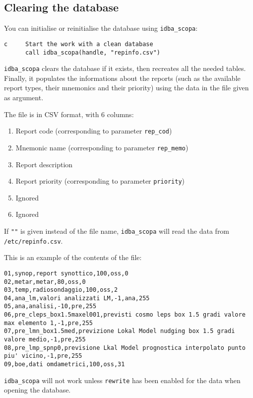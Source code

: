\documentclass[final,12pt,a4paper,twoside]{book}
\begin{document}
\subsection {Clearing the database}

You can initialise or reinitialise the database using {\tt idba\_scopa}:
\label{fun-idba_scopa}

\begin{verbatim}
c     Start the work with a clean database
      call idba_scopa(handle, "repinfo.csv")
\end{verbatim}

{\tt idba\_scopa} clears the database if it exists, then recreates all the
needed tables.  Finally, it populates the informations about the reports (such
as the available report types, their mnemonics and their priority) using the
data in the file given as argument.

The file is in CSV format, with 6 columns:
\begin{enumerate}
\item Report code (corresponding to parameter {\tt rep\_cod})
\item Mnemonic name (corresponding to parameter {\tt rep\_memo})
\item Report description
\item Report priority (corresponding to parameter {\tt priority})
\item Ignored
\item Ignored
\end{enumerate}

If {\tt ""} is given instead of the file name, {\tt idba\_scopa} will read the
data from {\tt /etc/repinfo.csv}.

This is an example of the contents of the file:

\begin{verbatim}
01,synop,report synottico,100,oss,0
02,metar,metar,80,oss,0
03,temp,radiosondaggio,100,oss,2
04,ana_lm,valori analizzati LM,-1,ana,255
05,ana,analisi,-10,pre,255
06,pre_cleps_box1.5maxel001,previsti cosmo leps box 1.5 gradi valore max elemento 1,-1,pre,255
07,pre_lmn_box1.5med,previzione Lokal Model nudging box 1.5 gradi valore medio,-1,pre,255
08,pre_lmp_spnp0,previsione Lkal Model prognostica interpolato punto piu' vicino,-1,pre,255
09,boe,dati omdametrici,100,oss,31
\end{verbatim}

{\tt idba\_scopa} will not work unless {\tt rewrite} has been enabled for the
data when opening the database.
\end{document}
